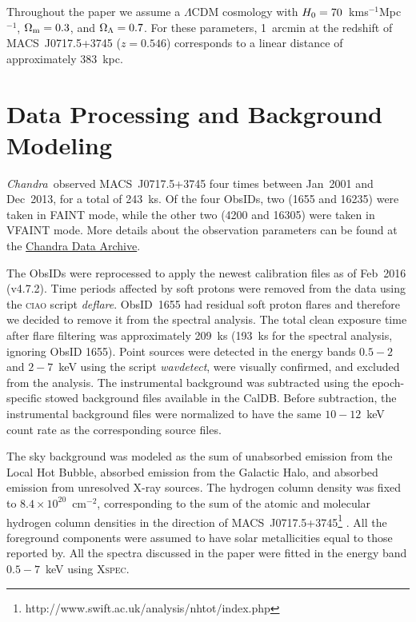 \documentclass[11pt,a4paper,useAMS,iop]{emulateapj}
\newcommand{\chandra}{\emph{Chandra}}
\begin{document}
Throughout the paper we assume a $\Lambda$CDM cosmology with $H_{\rm 0} = 70$~km\;s$^{-1}$\;Mpc$^{-1}$, $\Omega_{\rm m} = 0.3$, and $\Omega_{\rm \Lambda} = 0.7$. For these parameters, 1~arcmin at the redshift of MACS~J0717.5+3745 ($z=0.546$) corresponds to a linear distance of approximately 383~kpc. 

\section{Data Processing and Background Modeling}
\label{sec:DataAnalysis}

\chandra\ observed MACS~J0717.5+3745 four times between Jan~2001 and Dec~2013, for a total of 243~ks. Of the four ObsIDs, two (1655 and 16235) were taken in FAINT mode, while the other two (4200 and 16305) were taken in VFAINT mode. More details about the observation parameters can be found at the \href{http://cda.harvard.edu/chaser/}{Chandra Data Archive}.

The ObsIDs were reprocessed to apply the newest calibration files as of Feb~2016 (v4.7.2). Time periods affected by soft protons were removed from the data using the \textsc{ciao} script \emph{deflare}. ObsID~1655 had residual soft proton flares and therefore we decided to remove it from the spectral analysis. The total clean exposure time after flare filtering was approximately 209~ks (193~ks for the spectral analysis, ignoring ObsID 1655). Point sources were detected in the energy bands $0.5-2$ and $2-7$~keV using the script \emph{wavdetect}, were visually confirmed, and excluded from the analysis. The instrumental background was subtracted using the epoch-specific stowed background files available in the CalDB. Before subtraction, the instrumental background files were normalized to have the same $10-12$~keV count rate as the corresponding source files. 

The sky background was modeled as the sum of unabsorbed emission from the Local Hot Bubble, absorbed emission from the Galactic Halo, and absorbed emission from unresolved X-ray sources. The hydrogen column density was fixed to $8.4\times 10^{20}$~cm$^{-2}$, corresponding to the sum of the atomic and molecular hydrogen column densities in the direction of MACS~J0717.5+3745\footnote{http://www.swift.ac.uk/analysis/nhtot/index.php} \citep{Kalberla2005, Willingale2013}. All the foreground components were assumed to have solar metallicities equal to those reported by\citet{Feldman1992}. All the spectra discussed in the paper were fitted in the energy band $0.5-7$~keV using \textsc{Xspec}.
\end{document}
